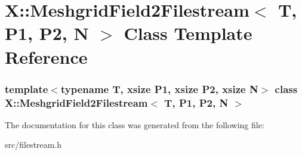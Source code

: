 \hypertarget{class_x_1_1_meshgrid_field2_filestream}{\section{X\-:\-:Meshgrid\-Field2\-Filestream$<$ T, P1, P2, N $>$ Class Template Reference}
\label{class_x_1_1_meshgrid_field2_filestream}
}
\subsubsection*{template$<$typename T, xsize P1, xsize P2, xsize N$>$ class X\-::\-Meshgrid\-Field2\-Filestream$<$ T, P1, P2, N $>$}



The documentation for this class was generated from the following file\-:\begin{DoxyCompactItemize}
\item 
src/filestream.\-h\end{DoxyCompactItemize}
